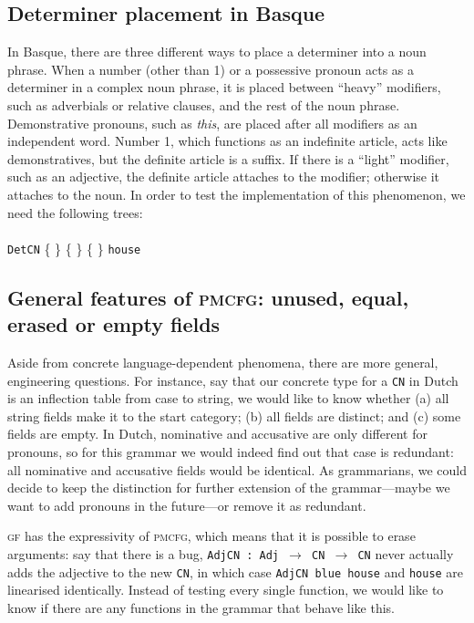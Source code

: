 \documentclass[11pt]{article}
\def\t#1{\texttt{#1}}
\def\gf{\textsc{gf}}
\def\pmcfg{\textsc{pmcfg}}
\newcommand{\tts}[1]{{\tt #1}}
\begin{document}
\subsection{Determiner placement in Basque} In Basque, there are three
different ways to place a determiner into a noun phrase. When a number
(other than 1) or a possessive pronoun acts as a determiner in a
complex noun phrase, it is placed between ``heavy'' modifiers, such as
adverbials or relative clauses, and the rest of the noun
phrase. Demonstrative pronouns, such as \emph{this}, are placed after
all modifiers as an independent word. Number 1, which functions as an
indefinite article, acts like demonstratives, but the definite article is a suffix. If there is a ``light'' modifier, such as an adjective, the definite article attaches to the modifier; otherwise it attaches to the noun. In order to test the
 implementation of this phenomenon, we need the following trees: \\ \\ 
\t{DetCN} \{
\stackanchor{\stackanchor{}{\tts{the}}}{\stackanchor{\tts{this}}{\tts{your}}}
\} \{  \} 
\{  \}  {\tt house} 

\subsection{General features of \pmcfg: unused, equal,
  erased or empty fields}

Aside from concrete language-dependent phenomena, there are more
general, engineering questions. For instance, say that our
concrete type for a \t{CN} in Dutch is an inflection table from case
to string, we would like to know whether (a) all string fields make it to
the start category; (b) all fields are distinct; and (c) some fields
are empty. In Dutch, nominative and accusative are only different for
pronouns, so for this grammar we would indeed find out that case is
redundant: all nominative and accusative fields would be
identical. As grammarians, we could decide to keep the distinction for
further extension of the grammar---maybe we want to add pronouns in
the future---or remove it as redundant.

\gf{} has the expressivity of \pmcfg{}, which means that it is
possible to erase arguments: say that there is a bug, \t{AdjCN : Adj
  $\rightarrow$ CN  $\rightarrow$ CN} never actually adds the
adjective to the new \t{CN}, in which case \t{AdjCN blue house} and
\t{house} are linearised identically. Instead of testing every single
function, we would like to know if there are any functions in the
grammar that behave like this.
\end{document}

